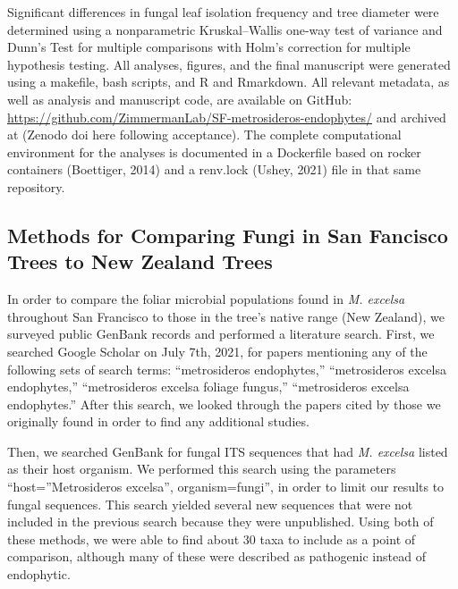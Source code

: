 \documentclass[fleqn,10pt,lineno]{wlpeerj} %
\begin{document}
Significant differences in fungal leaf isolation frequency and tree diameter were determined using a nonparametric Kruskal--Wallis one-way test of variance and Dunn's Test for multiple comparisons with Holm's correction for multiple hypothesis testing. All analyses, figures, and the final manuscript were generated using a makefile, bash scripts, and R and Rmarkdown. All relevant metadata, as well as analysis and manuscript code, are available on GitHub: \url{https://github.com/ZimmermanLab/SF-metrosideros-endophytes/} and archived at (Zenodo doi here following acceptance). The complete computational environment for the analyses is documented in a Dockerfile based on rocker containers (Boettiger, 2014) and a renv.lock (Ushey, 2021) file in that same repository.

\hypertarget{methods-for-comparing-fungi-in-san-fancisco-trees-to-new-zealand-trees}{%
\subsection*{Methods for Comparing Fungi in San Fancisco Trees to New Zealand Trees}\label{methods-for-comparing-fungi-in-san-fancisco-trees-to-new-zealand-trees}}

In order to compare the foliar microbial populations found in \emph{M. excelsa} throughout San Francisco to those in the tree's native range (New Zealand), we surveyed public GenBank records and performed a literature search. First, we searched Google Scholar on July 7th, 2021, for papers mentioning any of the following sets of search terms: ``metrosideros endophytes,'' ``metrosideros excelsa endophytes,'' ``metrosideros excelsa foliage fungus,'' ``metrosideros excelsa endophytes.'' After this search, we looked through the papers cited by those we originally found in order to find any additional studies.

Then, we searched GenBank for fungal ITS sequences that had \emph{M. excelsa} listed as their host organism. We performed this search using the parameters ``host=''Metrosideros excelsa'', organism=fungi'', in order to limit our results to fungal sequences. This search yielded several new sequences that were not included in the previous search because they were unpublished. Using both of these methods, we were able to find about 30 taxa to include as a point of comparison, although many of these were described as pathogenic instead of endophytic.
\end{document}
